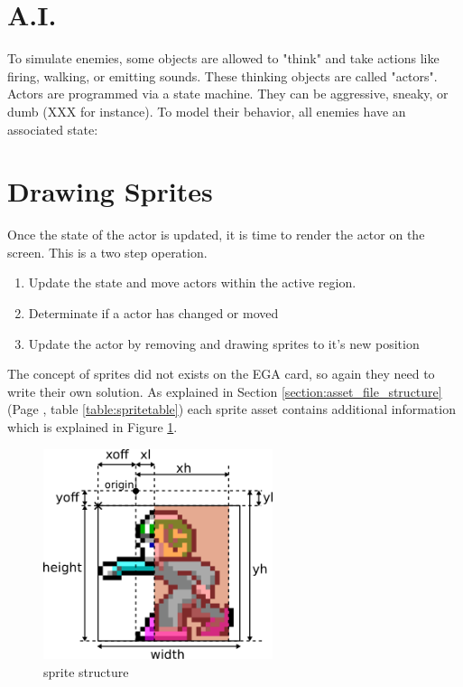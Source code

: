 \documentclass[book.tex]{subfiles}
\begin{document}
\section{A.I.}
To simulate enemies, some objects are allowed to "think" and take actions like firing, walking,
or emitting sounds. These thinking objects are called "actors".
Actors are programmed via a state machine. They can be aggressive, sneaky, or dumb
(XXX for instance). To model their behavior, all enemies have an associated state:

\section{Drawing Sprites}
Once the state of the actor is updated, it is time to render the actor on the screen. This is a two step operation.
\begin{enumerate}
\item Update the state and move actors within the active region.
\item Determinate if a actor has changed or moved
\item Update the actor by removing and drawing sprites to it's new position
\end{enumerate}

The concept of sprites did not exists on the EGA card, so again they need to write their own solution. As explained in Section \ref{section:asset_file_structure} (Page \pageref{table:spritetable}, table \ref{table:spritetable}) each sprite asset contains additional information which is explained in Figure \ref{fig:sprite_structure}.\\
\begin{figure}[H]
  \centering
  \includegraphics[width=0.6\textwidth]{imgs/drawings/sprite.png}
  \caption{sprite structure}
  \label{fig:sprite_structure}
\end{figure}
\end{document}
